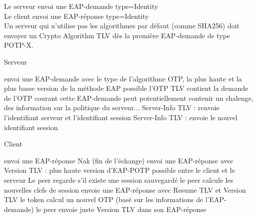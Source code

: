 \documentclass{article}
\begin{document}
Le serveur envoi une EAP-demande type=Identity\\
Le client envoi une EAP-réponse type=Identity\\

Un serveur qui n'utilise pas les algorithmes par défaut (comme SHA256) doit envoyer un Crypto Algorithm TLV dès la première EAP-demande de type POTP-X.\\

\begin{flushleft}
\begin{algorithm}[!h]
	\caption{Serveur}
	\label{POTP:verif}
\begin{algorithmic}
\STATE envoi une EAP-demande avec le type de l'algorithme OTP, la plus haute et la plus basse version de la méthode EAP possible
\STATE l'OTP TLV contient la demande de l'OTP courant
\STATE cette EAP-demande peut potentiellement contenir un chalenge, des information sur la politique du serveur...
	\STATE Server-Info TLV : renvoie l'identifiant serveur et l'identifiant session
\ELSE
	\STATE Server-Info TLV : envoie le nouvel identifiant session
\ENDIF

\end{algorithmic}
\end{algorithm}
\end{flushleft}


\begin{flushright}
\begin{algorithm}[!h]
	\caption{Client}
	\label{POTP:verif}
\begin{algorithmic}
	\STATE envoi une EAP-réponse Nak (fin de l'échange)
\ELSE
	\STATE envoi une EAP-réponse avec Version TLV : plus haute version d'EAP-POTP possible entre le client et le serveur
		\STATE Le peer regarde s'il existe une session sauvegardé
				\STATE le peer calcule les nouvelles clefs de session
			\ENDIF
			\STATE envoie une EAP-réponse avec Resume TLV et Version TLV
		\ENDIF
		\STATE le token calcul un nouvel OTP (basé sur les informations de l'EAP-demande)
		\STATE le peer envoie juste Version TLV dans son EAP-réponse
	\ENDIF
\ENDIF

\end{algorithmic}
\end{algorithm}
\end{flushright}
\end{document}

